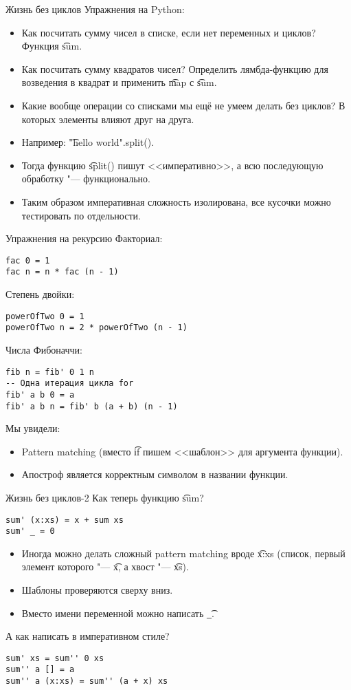 \begin{frame}[t]{Жизнь без циклов}
	Упражнения на Python:
	\begin{itemize}
		\item Как посчитать сумму чисел в списке, если нет переменных и циклов?\pause Функция \t{sum}.\pause
		\item Как посчитать сумму квадратов чисел? \pause Определить лямбда-функцию для возведения в квадрат и применить \t{map} с \t{sum}.\pause
		\item Какие вообще операции со списками мы ещё не умеем делать без циклов? \pause В которых элементы влияют друг на друга.
		\item Например: \t{"hello world".split()}.
		\item Тогда функцию \t{split()} пишут <<императивно>>, а всю последующую обработку "--- функционально.
		\item Таким образом императивная сложность изолирована, все кусочки можно тестировать по отдельности.
	\end{itemize}
\end{frame}

\begin{frame}[t,fragile]{Упражнения на рекурсию}
	Факториал:
\begin{verbatim}
fac 0 = 1
fac n = n * fac (n - 1)
\end{verbatim}
	Степень двойки: \pause
\begin{verbatim}
powerOfTwo 0 = 1
powerOfTwo n = 2 * powerOfTwo (n - 1)
\end{verbatim}
	Числа Фибоначчи: \pause
\begin{verbatim}
fib n = fib' 0 1 n
-- Одна итерация цикла for
fib' a b 0 = a
fib' a b n = fib' b (a + b) (n - 1)
\end{verbatim}
	Мы увидели:
	\begin{itemize}
		\item Pattern matching (вместо \t{if} пишем <<шаблон>> для аргумента функции).
		\item Апостроф является корректным символом в названии функции.
	\end{itemize}
\end{frame}

\begin{frame}[t,fragile]{Жизнь без циклов-2}
	Как теперь функцию \t{sum}? \pause
\begin{verbatim}
sum' (x:xs) = x + sum xs
sum' _ = 0
\end{verbatim}
	\begin{itemize}
		\item Иногда можно делать сложный pattern matching вроде \t{x:xs} (список, первый элемент которого "--- \t{x}, а хвост "--- \t{xs}).
		\item Шаблоны проверяются сверху вниз.
		\item Вместо имени переменной можно написать \t{\_}.
	\end{itemize}
	А как написать в императивном стиле? \pause
\begin{verbatim}
sum' xs = sum'' 0 xs
sum'' a [] = a
sum'' a (x:xs) = sum'' (a + x) xs
\end{verbatim}
\end{frame}

